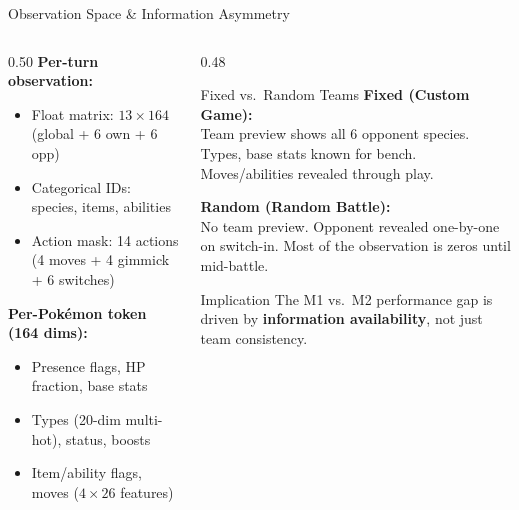 \documentclass[aspectratio=169, 11pt]{beamer}
\begin{document}
\begin{frame}{Observation Space \& Information Asymmetry}
  \begin{columns}[T]
    \begin{column}{0.50\textwidth}
      \textbf{Per-turn observation:}
      \begin{itemize}\setlength{\itemsep}{0.2em}
        \item Float matrix: $13 \times 164$ (global + 6 own + 6 opp)
        \item Categorical IDs: species, items, abilities
        \item Action mask: 14 actions (4 moves + 4 gimmick + 6 switches)
      \end{itemize}

      \vspace{0.4em}
      \textbf{Per-Pok\'{e}mon token (164 dims):}
      \begin{itemize}\setlength{\itemsep}{0.1em}\small
        \item Presence flags, HP fraction, base stats
        \item Types (20-dim multi-hot), status, boosts
        \item Item/ability flags, moves ($4 \times 26$ features)
      \end{itemize}
    \end{column}

    \begin{column}{0.48\textwidth}
      \begin{alertblock}{Fixed vs.\ Random Teams}
        \small
        \textbf{Fixed (Custom Game):}\\
        Team preview shows all 6 opponent species.
        Types, base stats known for bench.
        Moves/abilities revealed through play.

        \vspace{0.3em}
        \textbf{Random (Random Battle):}\\
        No team preview. Opponent revealed
        one-by-one on switch-in. Most of the
        observation is zeros until mid-battle.
      \end{alertblock}

      \vspace{0.2em}
      \begin{exampleblock}{Implication}
        \small
        The M1 vs.\ M2 performance gap is driven by
        \textbf{information availability}, not just team consistency.
      \end{exampleblock}
    \end{column}
  \end{columns}
\end{frame}
\end{document}
